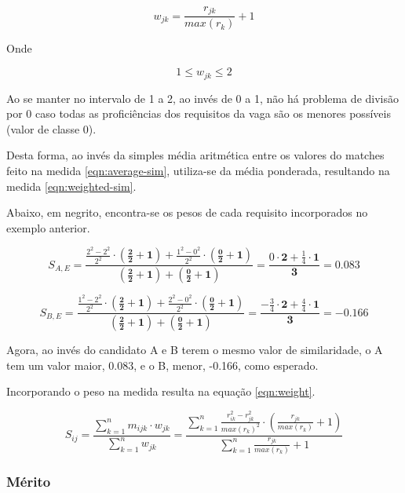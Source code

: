 \documentclass[preprint,12pt]{elsarticle}
\begin{document}
\begin{equation}
\label{eqn:weight}
    w_{jk} = \frac{r_{jk}}{max(r_k)} + 1
\end{equation}

Onde

\begin{equation}
1 \leq w_{jk} \leq 2
\end{equation}

Ao se manter no intervalo de 1 a 2, ao invés de 0 a 1, não há problema de divisão por 0 caso todas as proficiências dos requisitos da vaga são os menores possíveis (valor de classe 0).

Desta forma, ao invés da simples média aritmética entre os valores do matches feito na medida \ref{eqn:average-sim}, utiliza-se da média ponderada, resultando na medida \ref{eqn:weighted-sim}. 

Abaixo, em negrito, encontra-se os pesos de cada requisito incorporados no exemplo anterior.

$$ S_{A,E} = \frac{\tfrac{2^2 - 2^2}{2^2} \cdot \boldsymbol{(\tfrac{2}{2} + 1)} + \tfrac{1^2 - 0^2}{2^2} \cdot \boldsymbol{(\tfrac{0}{2} + 1)}}{\boldsymbol{(\tfrac{2}{2} + 1)} + \boldsymbol{(\tfrac{0}{2} + 1)}} = \frac{0 \cdot \textbf{2} + \tfrac{1}{4} \cdot \textbf{1}}{\textbf{3}} = 0.083 $$

$$ S_{B,E} = \frac{\tfrac{1^2 - 2^2}{2^2} \cdot \boldsymbol{(\tfrac{2}{2} + 1)} + \tfrac{2^2 - 0^2}{2^2} \cdot \boldsymbol{(\tfrac{0}{2} + 1)}}{\boldsymbol{(\tfrac{2}{2} + 1)} + \boldsymbol{(\tfrac{0}{2} + 1)}} = \frac{-\tfrac{3}{4} \cdot \textbf{2} + \tfrac{4}{4} \cdot \textbf{1}}{\textbf{3}} = -0.166 $$

Agora, ao invés do candidato A e B terem o mesmo valor de similaridade, o A tem um valor maior, 0.083, e o B, menor, -0.166, como esperado.

Incorporando o peso na medida resulta na equação \ref{eqn:weight}. 

\begin{equation}
\label{eqn:weighted-sim}
S_{ij} = \frac{\sum_{k=1}^n m_{ijk} \cdot w_{jk}}
              {\sum_{k=1}^n w_{jk}} = 
         \frac{\sum_{k=1}^n \frac{r_{ik}^2 - r_{jk}^2}{max(r_k)^2} \cdot (\frac{r_{jk}}{max(r_k)} + 1)}
              {\sum_{k=1}^n {\frac{r_{jk}}{max(r_k)} + 1}}
\end{equation}

\subsubsection{Mérito}
\label{sssec:merit}
\end{document}
